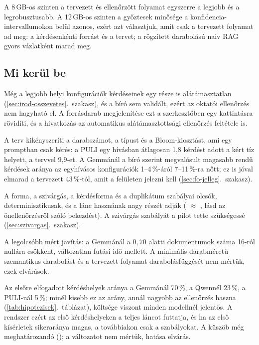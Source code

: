 A 8\,GB-os szinten a tervezett és ellenőrzött folyamat egyszerre a legjobb és a legrobusztusabb. A
12\,GB-os szinten a győztesek minősége a konfidencia-intervallumokon belül azonos, ezért azt választjuk, amit
csak a tervezett folyamat ad meg: a kérdésenkénti forrást és a tervet; a rögzített darabolású naiv RAG gyors
vázlatként marad meg.

\subsection*{Mi kerül be}

\begin{description}[style=nextline,leftmargin=0.6cm]
\item[Kérdésenkénti forráshivatkozás (P1).] Még a legjobb helyi konfigurációk kérdéseinek egy része is
alátámasztatlan (\ref{sec:irod-osszevetes}.~szakasz), és a bíró sem validált, ezért az oktatói ellenőrzés nem
hagyható el. A forrásdarab megjelenítése ezt a szerkesztőben egy kattintásra rövidíti, és a hivatkozás az
automatikus alátámasztottsági ellenőrzés feltétele is.
\item[Vizsgaterv (P2).] A terv kikényszeríti a darabszámot, a típust és a Bloom-kiosztást, ami egy
promptban csak kérés: a PULI egy hívásban átlagosan 1,8 kérdést adott a kért tíz helyett, a tervvel 9,9-et. A Gemmánál a bíró szerint megvalósult magasabb rendű kérdések aránya az
egyhívásos konfigurációk 1--4\,\%-áról 7--11\,\%-ra nőtt; ez is jóval elmarad a tervezett 43\,\%-tól, amit a
felületen jelezni kell (\ref{sec:fo-jelleg}.~szakasz).
\item[Szabályalapú ellenőrzés.] A forma, a szivárgás, a kérdésforma és a duplikátum szabályai olcsók,
determinisztikusak, és a lánc hasznának nagy részét adják ( $\approx$ , lásd az
önellenőrzésről szóló bekezdést). A szivárgás szabályát a pilot tette szükségessé
(\ref{sec:szivargas}.~szakasz).
\item[Rögzített vagy minimális méretű darabolás a naiv útvonalon is.] A legolcsóbb mért javítás: a Gemmánál a
$0{,}70$ alatti dokumentumok száma 16-ról nullára csökkent, változatlan futási idő mellett. A minimális
darabméretű szemantikus darabolást és a tervezett folyamat darabolásfüggését nem mértük, ezek elvárások.
\item[Adaptív ellenőrzés.] Az elsőre elfogadott kérdéshelyek aránya a Gemmánál 70\,\%, a Qwennél 23\,\%, a
PULI-nál 5\,\%; minél kisebb ez az arány, annál nagyobb az ellenőrzés haszna
(\ref{tab:hipotezisek}.~táblázat), költsége viszont minden modellnél jelentős. A rendszer ezért az első kérdéshelyeken a teljes láncot futtatja, és ha
az első kísérletek sikeraránya magas, a továbbiakon csak a szabályokat. A küszöb még meghatározandó
(); a változatot nem mértük, hatása elvárás.
\end{description}

